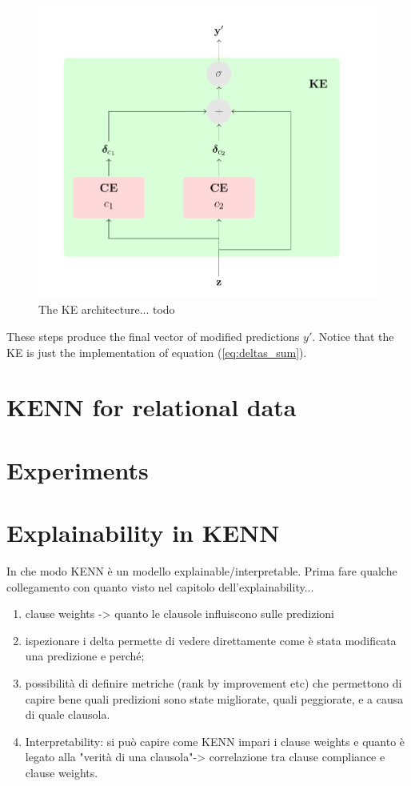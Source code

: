\begin{figure}
	\centering
	\includegraphics[width=0.8\linewidth]{figures/KE.png}
	\caption{The KE architecture... todo}
	\label{fig:KE}
\end{figure}

 These steps produce the final vector of modified predictions $y'$. Notice that the KE is just the implementation of equation (\ref{eq:deltas_sum}).
 
 \section{KENN for relational data}
 \section{Experiments}
 \section{Explainability in KENN}
 In che modo KENN è un modello explainable/interpretable.
 Prima fare qualche collegamento con quanto visto nel capitolo dell'explainability...
 \begin{enumerate}
 	\item clause weights -> quanto le clausole influiscono sulle predizioni
 	\item ispezionare i delta permette di vedere direttamente come è stata modificata una predizione e perché;
 	\item possibilità di definire metriche (rank by improvement etc) che permettono di capire bene quali predizioni sono state migliorate, quali peggiorate, e a causa di quale clausola.
 	\item Interpretability: si può capire come KENN impari i clause weights e quanto è legato alla "verità di una clausola"-> correlazione tra clause compliance e clause weights.
 \end{enumerate}

